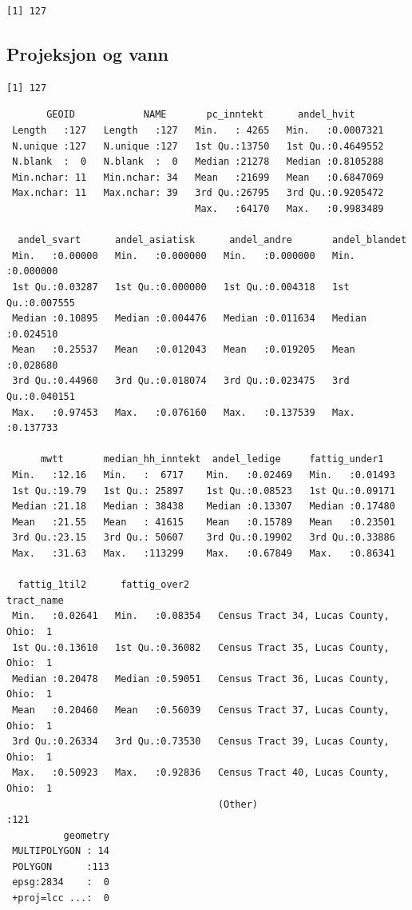\documentclass[
  norsk,
  a4paper,
]{article}
\begin{document}
\begin{verbatim}
[1] 127
\end{verbatim}

\subsection{Projeksjon og vann}\label{projeksjon-og-vann}

\begin{verbatim}
[1] 127
\end{verbatim}

\begin{verbatim}
       GEOID            NAME       pc_inntekt      andel_hvit       
 Length   :127   Length   :127   Min.   : 4265   Min.   :0.0007321  
 N.unique :127   N.unique :127   1st Qu.:13750   1st Qu.:0.4649552  
 N.blank  :  0   N.blank  :  0   Median :21278   Median :0.8105288  
 Min.nchar: 11   Min.nchar: 34   Mean   :21699   Mean   :0.6847069  
 Max.nchar: 11   Max.nchar: 39   3rd Qu.:26795   3rd Qu.:0.9205472  
                                 Max.   :64170   Max.   :0.9983489  
                                                                    
  andel_svart      andel_asiatisk      andel_andre       andel_blandet     
 Min.   :0.00000   Min.   :0.000000   Min.   :0.000000   Min.   :0.000000  
 1st Qu.:0.03287   1st Qu.:0.000000   1st Qu.:0.004318   1st Qu.:0.007555  
 Median :0.10895   Median :0.004476   Median :0.011634   Median :0.024510  
 Mean   :0.25537   Mean   :0.012043   Mean   :0.019205   Mean   :0.028680  
 3rd Qu.:0.44960   3rd Qu.:0.018074   3rd Qu.:0.023475   3rd Qu.:0.040151  
 Max.   :0.97453   Max.   :0.076160   Max.   :0.137539   Max.   :0.137733  
                                                                           
      mwtt       median_hh_inntekt  andel_ledige     fattig_under1    
 Min.   :12.16   Min.   :  6717    Min.   :0.02469   Min.   :0.01493  
 1st Qu.:19.79   1st Qu.: 25897    1st Qu.:0.08523   1st Qu.:0.09171  
 Median :21.18   Median : 38438    Median :0.13307   Median :0.17480  
 Mean   :21.55   Mean   : 41615    Mean   :0.15789   Mean   :0.23501  
 3rd Qu.:23.15   3rd Qu.: 50607    3rd Qu.:0.19902   3rd Qu.:0.33886  
 Max.   :31.63   Max.   :113299    Max.   :0.67849   Max.   :0.86341  
                                                                      
  fattig_1til2      fattig_over2                                   tract_name 
 Min.   :0.02641   Min.   :0.08354   Census Tract 34, Lucas County, Ohio:  1  
 1st Qu.:0.13610   1st Qu.:0.36082   Census Tract 35, Lucas County, Ohio:  1  
 Median :0.20478   Median :0.59051   Census Tract 36, Lucas County, Ohio:  1  
 Mean   :0.20460   Mean   :0.56039   Census Tract 37, Lucas County, Ohio:  1  
 3rd Qu.:0.26334   3rd Qu.:0.73530   Census Tract 39, Lucas County, Ohio:  1  
 Max.   :0.50923   Max.   :0.92836   Census Tract 40, Lucas County, Ohio:  1  
                                     (Other)                            :121  
          geometry  
 MULTIPOLYGON : 14  
 POLYGON      :113  
 epsg:2834    :  0  
 +proj=lcc ...:  0  
                    

\end{verbatim}
\end{document}
